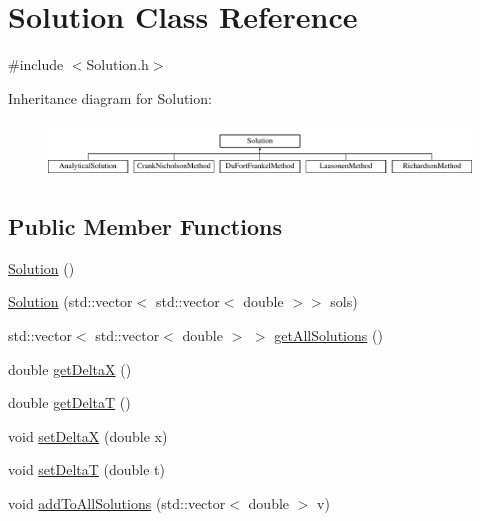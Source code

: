 \hypertarget{class_solution}{}\section{Solution Class Reference}
\label{class_solution}


{\ttfamily \#include $<$Solution.\+h$>$}

Inheritance diagram for Solution\+:\begin{figure}[H]
\begin{center}
\leavevmode
\includegraphics[height=1.473684cm]{class_solution}
\end{center}
\end{figure}
\subsection*{Public Member Functions}
\begin{DoxyCompactItemize}
\item 
\hyperlink{class_solution_ab55bd4b023d596ce11aaf737b9a6123b}{Solution} ()
\item 
\hyperlink{class_solution_acd2b9ac1b6ddd327ece034d99fc9cfdd}{Solution} (std\+::vector$<$ std\+::vector$<$ double $>$$>$ sols)
\item 
std\+::vector$<$ std\+::vector$<$ double $>$ $>$ \hyperlink{class_solution_abd28abd062adb793866fd5e1c8ef8639}{get\+All\+Solutions} ()
\item 
double \hyperlink{class_solution_a45756ea0f3bbd5a69e1ddcd12379f398}{get\+DeltaX} ()
\item 
double \hyperlink{class_solution_ab5e6d31c8b567a20dce17b802242bd02}{get\+DeltaT} ()
\item 
void \hyperlink{class_solution_a0e651029193eddea478a8f9d68e74355}{set\+DeltaX} (double x)
\item 
void \hyperlink{class_solution_af301d534e2214c1004837350d32569a7}{set\+DeltaT} (double t)
\item 
void \hyperlink{class_solution_a0ea58d9480ccb4e344c377f4861e1e7f}{add\+To\+All\+Solutions} (std\+::vector$<$ double $>$ v)
\end{DoxyCompactItemize}
